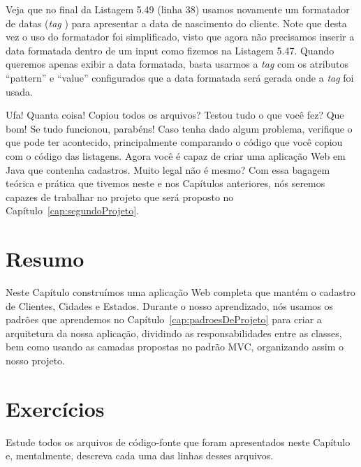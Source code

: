 
Veja que no final da Listagem 5.49 (linha 38) usamos novamente um formatador de datas (\textit{tag} ) para apresentar a data de nascimento do cliente. Note que desta vez o uso do formatador foi simplificado, visto que agora não precisamos inserir a data formatada dentro de um input como fizemos na Listagem 5.47. Quando queremos apenas exibir a data formatada, basta usarmos a \textit{tag}  com os atributos ``pattern'' e ``value'' configurados que a data formatada será gerada onde a \textit{tag} foi usada.

Ufa! Quanta coisa! Copiou todos os arquivos? Testou tudo o que você fez? Que bom! Se tudo funcionou, parabéns! Caso tenha dado algum problema, verifique o que pode ter acontecido, principalmente comparando o código que você copiou com o código das listagens. Agora você é capaz de criar uma aplicação Web em Java que contenha cadastros. Muito legal não é mesmo? Com essa bagagem teórica e prática que tivemos neste e nos Capítulos anteriores, nós seremos capazes de trabalhar no projeto que será proposto no Capítulo~\ref{cap:segundoProjeto}.

\section{Resumo}

Neste Capítulo construímos uma aplicação Web completa que mantém o cadastro de Clientes, Cidades e Estados. Durante o nosso aprendizado, nós usamos os padrões que aprendemos no Capítulo~\ref{cap:padroesDeProjeto} para criar a arquitetura da nossa aplicação, dividindo as responsabilidades entre as classes, bem como usando as camadas propostas no padrão MVC, organizando assim o nosso projeto. 


\section{Exercícios}

\begin{exercicioSemArquivo}{}{}{}
    Estude todos os arquivos de código-fonte que foram apresentados neste Capítulo e, mentalmente, descreva cada uma das linhas desses arquivos.
\end{exercicioSemArquivo}


